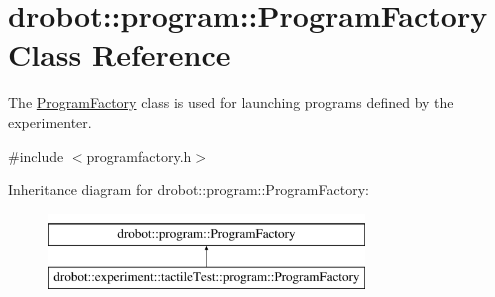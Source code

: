 \hypertarget{classdrobot_1_1program_1_1ProgramFactory}{\section{drobot\-:\-:program\-:\-:Program\-Factory Class Reference}
\label{classdrobot_1_1program_1_1ProgramFactory}
}


The \hyperlink{classdrobot_1_1program_1_1ProgramFactory}{Program\-Factory} class is used for launching programs defined by the experimenter.  




{\ttfamily \#include $<$programfactory.\-h$>$}

Inheritance diagram for drobot\-:\-:program\-:\-:Program\-Factory\-:\begin{figure}[H]
\begin{center}
\leavevmode
\includegraphics[height=2.000000cm]{classdrobot_1_1program_1_1ProgramFactory}
\end{center}
\end{figure}
